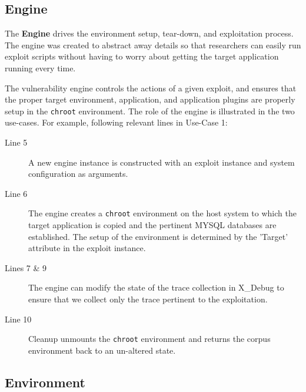 \documentclass[letterpaper,twocolumn,10pt]{article}
\begin{document}
\subsection{Engine}
The {\bf Engine} drives the environment setup, tear-down, and exploitation process. The engine was created to abstract away details so that researchers can easily run exploit scripts without having to worry about getting the target application running every time. \par
The vulnerability engine controls the actions of a given exploit, and ensures that the proper target environment, application, and application plugins are properly setup in the {\tt chroot} environment. The role of the engine is illustrated in the two use-cases. For example, following relevant lines in Use-Case 1:
\begin{description}
  \item[Line 5] A new engine instance is constructed with an exploit instance and system configuration as arguments.
  \item[Line 6] The engine creates a {\tt chroot} environment on the host system to which the target application is copied and the pertinent MYSQL databases are established. The setup of the environment is determined by the 'Target' attribute in the exploit instance. 
  \item[Lines 7 \& 9] The engine can modify the state of the trace collection in X\_Debug to ensure that we collect only the trace pertinent to the exploitation.
  \item[Line 10] Cleanup unmounts the {\tt chroot} environment and returns the corpus environment back to an un-altered state.
\end{description}

\subsection{Environment}
\end{document}
